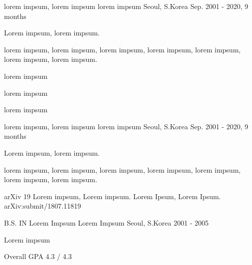 \documentclass{style}
\begin{document}
\cventry
{lorem impsum, lorem impsum}
{lorem impsum}
{Seoul, S.Korea}
{Sep. 2001 - 2020, 9 months}
{
\begin{cvitems}
    \item Lorem impsum, lorem impsum.
    \item lorem impsum, lorem impsum, lorem impsum, lorem impsum, lorem impsum, lorem impsum, lorem impsum.
    \item lorem impsum
    \item lorem impsum
    \item lorem impsum
\end{cvitems}
}

\cventry
{lorem impsum, lorem impsum}
{lorem impsum}
{Seoul, S.Korea}
{Sep. 2001 - 2020, 9 months}
{
\begin{cvitems}
    \item Lorem impsum, lorem impsum.
    \item lorem impsum, lorem impsum, lorem impsum, lorem impsum, lorem impsum, lorem impsum, lorem impsum.
\end{cvitems}
}

\publication
{arXiv}
{19}
{Lorem impsum, Lorem impsum.}
{Lorem Ipsum, Lorem Ipsum.}
{arXiv:submit/1807.11819}

\cventry
{B.S. IN Lorem Impsum}
{Lorem Impsum}
{Seoul, S.Korea}
{2001 - 2005}
{
\begin{cvitems}
    \item Lorem impsum
    \item {Overall GPA 4.3 / 4.3}
\end{cvitems}
}
\end{document}
